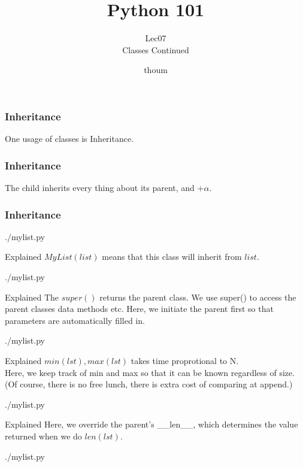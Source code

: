 \documentclass{beamer}
\title{Python 101}
\subtitle{Lec07 \\ Classes Continued}
\author{thoum}
\begin{document}
\frame{\titlepage}

\begin{frame}
\frametitle{Inheritance}
One usage of classes is Inheritance.
\end{frame}

\begin{frame}
\frametitle{Inheritance}
The child inherits every thing about its parent, and $+\alpha$.
\end{frame}

\begin{frame}[fragile]
\frametitle{Inheritance}
\begin{lstinputlisting}
  {./mylist.py}
\end{lstinputlisting}
\end{frame}

\begin{frame}{Explained}
  $MyList(list)$ means that this class will inherit from $list$.
  \begin{lstinputlisting}[firstline=1, lastline=1]
  {./mylist.py}
\end{lstinputlisting}
\end{frame}

\begin{frame}{Explained}
  The $super()$ returns the parent class. We use super() to access the parent
  classes data methods etc. Here, we initiate the parent first so that
  parameters are automatically filled in.
  \begin{lstinputlisting}[firstline=1, lastline=4]
  {./mylist.py}
\end{lstinputlisting}
\end{frame}

\begin{frame}{Explained}
  $min(lst), max(lst)$ takes time proprotional to N.\\
  Here, we keep track of min and max so that it can be known regardless of
  size.\\
  (Of course, there is no free lunch, there is extra cost of comparing at append.)
  \begin{lstinputlisting}[firstline=1, lastline=6]
  {./mylist.py}
  \end{lstinputlisting}
\end{frame}

\begin{frame}{Explained}
  Here, we override the parent's \_\_len\_\_, which determines the value
  returned when we do $len(lst)$.
  \begin{lstinputlisting}[firstline=8, lastline=10]
    {./mylist.py}
  \end{lstinputlisting}
\end{frame}
\end{document}

